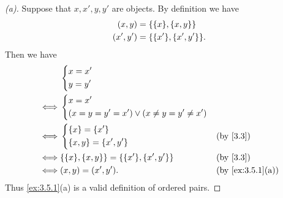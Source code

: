 \begin{proof}[(a)]
	Suppose that \(x, x', y, y'\) are objects.
	By definition we have
	\begin{align*}
		(x, y)   & = \set{\set{x}, \set{x, y}}     \\
		(x', y') & = \set{\set{x'}, \set{x', y'}}.
	\end{align*}
	Then we have
	\begin{align*}
		     & \begin{dcases}
			       x = x' \\
			       y = y'
		       \end{dcases}                                                                  \\
		\iff & \begin{dcases}
			       x = x' \\
			       \pa{x = y = y' = x'} \lor \pa{x \neq y = y' \neq x'}
		       \end{dcases}                            \\
		\iff & \begin{dcases}
			       \set{x} = \set{x'} \\
			       \set{x, y} = \set{x', y'}
		       \end{dcases}                                &  & \by{3.3}                      \\
		\iff & \set{\set{x}, \set{x, y}} = \set{\set{x'}, \set{x', y'}} &  & \by{3.3}         \\
		\iff & (x, y) = (x', y').                                       &  & \by{ex:3.5.1}[a]
	\end{align*}
	Thus \cref{ex:3.5.1}(a) is a valid definition of ordered pairs.
\end{proof}


